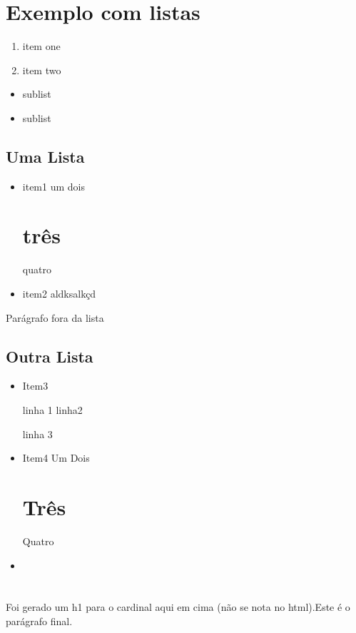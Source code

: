 \documentclass{article}
\begin{document}
\section*{Exemplo com listas}
\begin{enumerate}
\item  item one
\item  item two
\end{enumerate}
\begin{itemize}
\item  sublist
\item  sublist
\end{itemize}
\subsection*{Uma Lista}
\begin{itemize}
\item  item1
  um
  dois\section*{três}
  quatro
\item  item2
  aldksalkçd
\end{itemize}
Parágrafo fora da lista

\subsection*{Outra Lista}
\begin{itemize}
\item  Item3

  linha 1
  linha2

  linha 3


\item  Item4
  Um
  Dois

\section*{Três}
  Quatro


\item 


\end{itemize}
\section*{}
Foi gerado um h1 para o cardinal aqui em cima (não se nota no html).Este é o parágrafo final.
\end{document}
